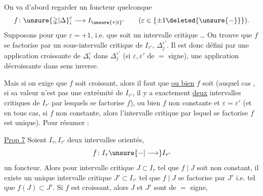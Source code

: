 On va d'abord regarder un foncteur quelconque
\[
 f\colon \unsure{\mathbb{\Delta}|\Delta}_i^\varepsilon\longrightarrow I_{\unsure{\tau|t}'}
 \qquad(\varepsilon\in\{\pm1\deleted{\unsure{-}}\}).
\]
Supposons pour   que $\varepsilon=+1$, i.e. que 
 soit un intervalle  critique
\ldots{} On trouve que $f$  se factorise
par un sous-intervalle critique de $I_{\tau'}$,
 $\mathbb{\Delta}_j^{\varepsilon'}$.
Il est donc défini par une application
croissante de $\Delta_i^\varepsilon$ dans $\Delta_j^{\varepsilon'}$ (si $\varepsilon,\varepsilon'$ de $=$ signe),
une application décroissante dans  sens inverse.

Mais si on exige que $f$ soit croissant, alors
il faut que \uline{ou bien}  $f$ soit 
(auquel cas , si sa valeur n'est pas une extrémité
de $I_{\tau'}$, il y a exactement \uline{deux} intervalles
critiques de $I_{\tau'}$   par lesquels se factorise $f$),
ou bien $f$ non constante et $\varepsilon=\varepsilon'$ (et en tous cas,
si $f$ non constante, alors l'intervalle critique par
lequel se factorise $f$ est unique). Pour
résumer :

\uline{Prop 7} Soient $I_\tau,I_{\tau'}$ deux intervalles orientés,
\[
 f\colon I_\tau\unsure{\mathbin{-}|\longrightarrow}I_{\tau'}
\]
un foncteur. Alors pour  intervalle critique
$J\subset I_\tau$ tel que $f\mid J$ soit non constant, il existe
un unique intervalle critique $J'\subset I_{\tau'}$ tel que
$f\mid J$ se factorise par $J'$ i.e. tel que $f(J)\subset J'$.
Si $f$ est croissant, alors $J$ et $J'$ sont de $=$ signe,
